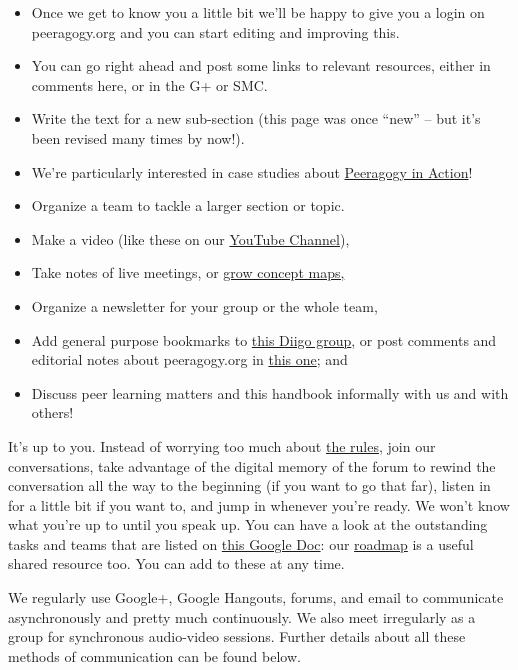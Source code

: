 \begin{itemize}
\item
  Once we get to know you a little bit we'll be happy to give you a
  login on peeragogy.org and you can start editing and improving this.
\item
  You can go right ahead and post some links to relevant resources,
  either in comments here, or in the G+ or SMC.
\item
  Write the text for a new sub-section (this page was once ``new'' --
  but it's been revised many times by now!).
\item
  We're particularly interested in case studies about
  \href{http://peeragogy.org/peeragogy-in-action/}{Peeragogy in Action}!
\item
  Organize a team to tackle a larger section or topic.
\item
  Make a video (like these on our
  \href{http://www.youtube.com/channel/UCIQY4ja8e4Br-i9U5KnmyZQ}{YouTube
  Channel}),
\item
  Take notes of live meetings, or
  \href{http://cmapspublic3.ihmc.us/rid=1K81VLSK7-1RL0RQ4-WZK/Peeragogy\%20Cmap.cmap}{grow
  concept maps,}
\item
  Organize a newsletter for your group or the whole team,
\item
  Add general purpose bookmarks to
  \href{http://groups.diigo.com/group/peeragogy-handbook}{this Diigo
  group}, or post comments and editorial notes about peeragogy.org in
  \href{http://groups.diigo.com/group/peering-into-peeragogy\%20}{this
  one}; and
\item
  Discuss peer learning matters and this handbook informally with us and
  with others!
\end{itemize}
It's up to you. Instead of worrying too much about
\href{http://peeragogy.org/co-working/}{the rules}, join our
conversations, take advantage of the digital memory of the forum to
rewind the conversation all the way to the beginning (if you want to go
that far), listen in for a little bit if you want to, and jump in
whenever you're ready. We won't know what you're up to until you speak
up. You can have a look at the outstanding tasks and teams that are
listed on
\href{https://docs.google.com/document/d/1\_2I-z-Pt5NUKk-fpy4jsqxFeXbWS4ao4sIhkxCcRVeI/edit\#}{this
Google Doc}: our
\href{http://peeragogy.org/peeragogy-org-roadmap/}{roadmap} is a useful
shared resource too. You can add to these at any time.

We regularly use Google+, Google Hangouts, forums, and email to
communicate asynchronously and pretty much continuously. We also meet
irregularly as a group for synchronous audio-video sessions. Further
details about all these methods of communication can be found below.

